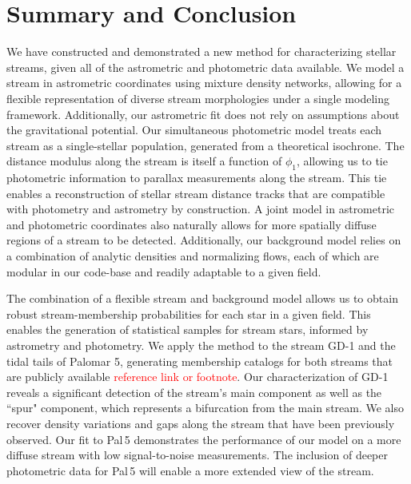 \documentclass[twocolumn]{aastex631}
\newcommand{\stream}[1]{#1}
\newcommand{\TODO}[1]{{\textcolor{red}{#1}}}
\newcommand{\JN}[1]{\TODO{#1}}
\begin{document}
\section{Summary and Conclusion} \label{sec:conclusions}

    We have constructed and demonstrated a new method for characterizing stellar
    streams, given all of the astrometric and photometric data available. We
    model a stream in astrometric coordinates using mixture density networks,
    allowing for a flexible representation of diverse stream morphologies under
    a single modeling framework. Additionally, our astrometric fit does not rely
    on assumptions about the gravitational potential. Our simultaneous
    photometric model treats each stream as a single-stellar population,
    generated from a theoretical isochrone. The distance modulus along the
    stream is itself a function of $\phi_1$, allowing us to tie photometric
    information to parallax measurements along the stream. This tie enables a
    reconstruction of stellar stream distance tracks that are compatible with
    photometry and astrometry by construction. A joint model in astrometric and
    photometric coordinates also naturally allows for more spatially diffuse
    regions of a stream to be detected. Additionally, our background model
    relies on a combination of analytic densities and normalizing flows, each of
    which are modular in our code-base and readily adaptable to a given field. 

    The combination of a flexible stream and background model allows us to
    obtain robust stream-membership probabilities for each star in a given
    field. This enables the generation of statistical samples for stream stars,
    informed by astrometry and photometry. We apply the method to the stream
    \stream{GD-1} and the tidal tails of \stream{Palomar 5}, generating
    membership catalogs for both streams that are publicly available
    \JN{reference link or footnote}. Our characterization of \stream{GD-1}
    reveals a significant detection of the stream's main component as well as
    the ``spur" component, which represents a bifurcation from the main stream.
    We also recover density variations and gaps along the stream that have been
    previously observed. Our fit to \stream{Pal\,5} demonstrates the performance
    of our model on a more diffuse stream with low signal-to-noise measurements.
    The inclusion of deeper photometric data for \stream{Pal\,5} will enable a
    more extended view of the stream.
    
\end{document}
